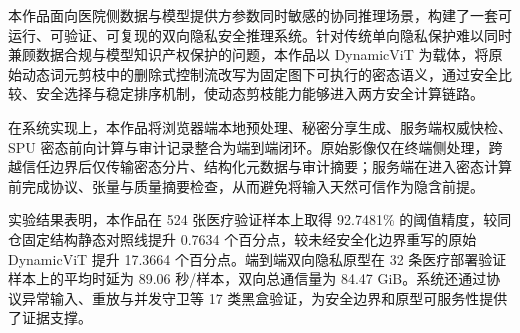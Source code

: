 本作品面向医院侧数据与模型提供方参数同时敏感的协同推理场景，构建了一套可运行、可验证、可复现的双向隐私安全推理系统。针对传统单向隐私保护难以同时兼顾数据合规与模型知识产权保护的问题，本作品以 DynamicViT 为载体，将原始动态词元剪枝中的删除式控制流改写为固定图下可执行的密态语义，通过安全比较、安全选择与稳定排序机制，使动态剪枝能力能够进入两方安全计算链路。

在系统实现上，本作品将浏览器端本地预处理、秘密分享生成、服务端权威快检、SPU 密态前向计算与审计记录整合为端到端闭环。原始影像仅在终端侧处理，跨越信任边界后仅传输密态分片、结构化元数据与审计摘要；服务端在进入密态计算前完成协议、张量与质量摘要检查，从而避免将输入天然可信作为隐含前提。

实验结果表明，本作品在 524 张医疗验证样本上取得 92.7481\% 的阈值精度，较同仓固定结构静态对照线提升 0.7634 个百分点，较未经安全化边界重写的原始 DynamicViT 提升 17.3664 个百分点。端到端双向隐私原型在 32 条医疗部署验证样本上的平均时延为 89.06 秒/样本，双向总通信量为 84.47 GiB。系统还通过协议异常输入、重放与并发守卫等 17 类黑盒验证，为安全边界和原型可服务性提供了证据支撑。
